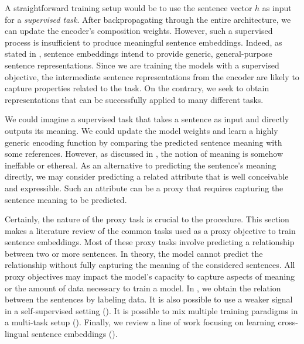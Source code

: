 A straightforward training setup would be to use the sentence vector $h$ as input for a \textit{supervised task}. After backpropagating through the entire architecture, we can update the encoder's composition weights. However, such a supervised process is insufficient to produce meaningful sentence embeddings. Indeed, as stated in , sentence embeddings intend to provide generic, general-purpose sentence representations. Since we are training the models with a supervised objective, the intermediate sentence representations from the encoder are likely to capture properties related to the task. On the contrary, we seek to obtain representations that can be successfully applied to many different tasks.

We could imagine a supervised task that takes a sentence as input and directly outputs its meaning. We could update the model weights and learn a highly generic encoding function by comparing the predicted sentence meaning with some references. However, as discussed in , the notion of meaning is somehow ineffable or ethereal. As an alternative to predicting the sentence's meaning directly, we may consider predicting a related attribute that is well conceivable and expressible. Such an attribute can be a proxy that requires capturing the sentence meaning to be predicted.

Certainly, the nature of the proxy task is crucial to the procedure. This section makes a literature review of the common tasks used as a proxy objective to train sentence embeddings. Most of these proxy tasks involve predicting a relationship between two or more sentences. In theory, the model cannot predict the relationship without fully capturing the meaning of the considered sentences. All proxy objectives may impact the model's capacity to capture aspects of meaning or the amount of data necessary to train a model. In , we obtain the relation between the sentences by labeling data. It is also possible to use a weaker signal in a self-supervised setting (). It is possible to mix multiple training paradigms in a multi-task setup (). Finally, we review a line of work focusing on learning cross-lingual sentence embeddings ().

